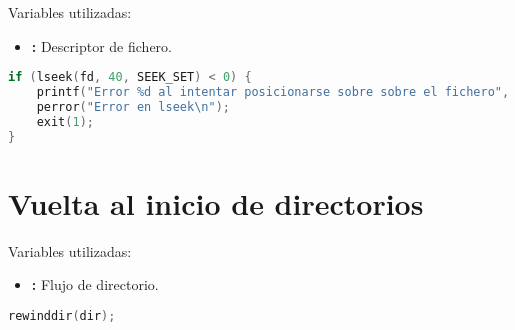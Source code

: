 Variables utilizadas:

\begin{itemize}
	\item{}\textbf{:} Descriptor de fichero.
\end{itemize}

\begin{lstlisting}[language=C]
if (lseek(fd, 40, SEEK_SET) < 0) {
	printf("Error %d al intentar posicionarse sobre sobre el fichero", errno);
	perror("Error en lseek\n");
	exit(1);
}
\end{lstlisting}

\section{Vuelta al inicio de directorios}

Variables utilizadas:

\begin{itemize}
	\item{}\textbf{:} Flujo de directorio.
\end{itemize}

\begin{lstlisting}[language=C]
rewinddir(dir);
\end{lstlisting}

